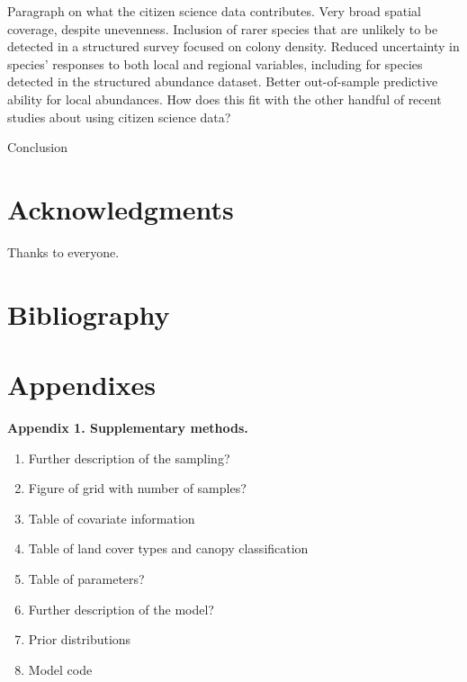\documentclass[preprint,review,times,12pt]{elsarticle}
\begin{document}
Paragraph on what the citizen science data contributes. Very broad spatial coverage, despite unevenness. Inclusion of rarer species that are unlikely to be detected in a structured survey focused on colony density. Reduced uncertainty in species' responses to both local and regional variables, including for species detected in the structured abundance dataset. Better out-of-sample predictive ability for local abundances. How does this fit with the other handful of recent studies about using citizen science data?

Conclusion



\section{Acknowledgments}
Thanks to everyone.

\newpage
\section{Bibliography}




\newpage
\section{Appendixes}
\textbf{Appendix 1. Supplementary methods.}
\begin{enumerate}
    \item Further description of the sampling?
    \item Figure of grid with number of samples?
    \item Table of covariate information
    \item Table of land cover types and canopy classification
    \item Table of parameters?
    \item Further description of the model?
    \item Prior distributions
    \item Model code
\end{enumerate}
\end{document}
